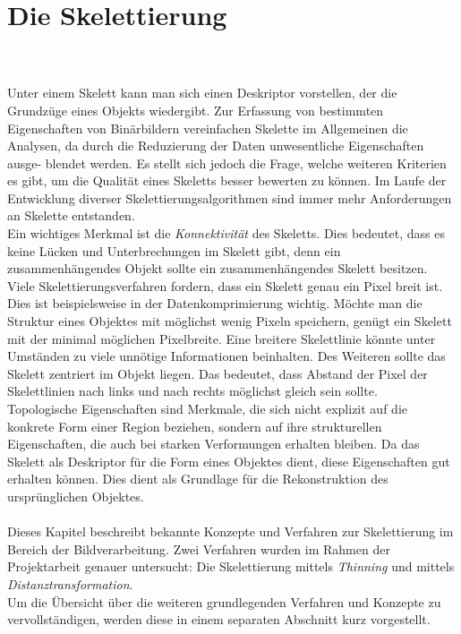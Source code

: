 \chapter{Die Skelettierung}
\label{ch:Skelettierung}
\\\\
Unter einem Skelett kann man sich einen Deskriptor vorstellen, der die Grundzüge eines Objekts wiedergibt. Zur Erfassung von bestimmten Eigenschaften von Binärbildern vereinfachen Skelette im Allgemeinen die Analysen, da durch die Reduzierung der Daten unwesentliche Eigenschaften ausge-
blendet werden. Es stellt sich jedoch die Frage, welche weiteren Kriterien es gibt, um die Qualität eines Skeletts besser bewerten zu können. Im Laufe
der Entwicklung diverser Skelettierungsalgorithmen sind 
immer mehr Anforderungen an Skelette entstanden. \\
Ein wichtiges Merkmal ist die  \emph{Konnektivität} des Skeletts. Dies bedeutet, dass es keine Lücken und Unterbrechungen im Skelett gibt, denn ein zusammenhängendes Objekt sollte ein zusammenhängendes Skelett besitzen.\\
Viele Skelettierungsverfahren fordern, dass ein Skelett genau ein Pixel breit ist. Dies ist beispielsweise in der Datenkomprimierung wichtig. Möchte man die Struktur eines
Objektes mit möglichst wenig Pixeln speichern, genügt ein
Skelett mit der minimal möglichen Pixelbreite. Eine breitere
Skelettlinie könnte unter Umständen zu viele unnötige Informationen beinhalten. Des Weiteren sollte das Skelett zentriert im Objekt liegen. Das bedeutet, dass Abstand der
Pixel der Skelettlinien nach links und nach rechts 
möglichst gleich sein sollte.\\
Topologische Eigenschaften sind Merkmale, die sich nicht explizit auf die konkrete Form einer Region beziehen, sondern auf ihre strukturellen Eigenschaften, die auch bei starken Verformungen erhalten bleiben.
Da das Skelett als Deskriptor für die Form eines Objektes dient, diese Eigenschaften gut erhalten können. Dies 
dient als Grundlage für die Rekonstruktion des ursprünglichen Objektes.  \\\\
Dieses Kapitel beschreibt bekannte Konzepte und Verfahren zur Skelettierung im Bereich der Bildverarbeitung.
Zwei Verfahren wurden im Rahmen der Projektarbeit genauer untersucht: Die Skelettierung mittels \emph{Thinning} und mittels \emph{Distanztransformation}. \\
Um die Übersicht über die weiteren grundlegenden Verfahren und Konzepte zu vervollständigen, werden diese in einem separaten 
Abschnitt kurz vorgestellt.
